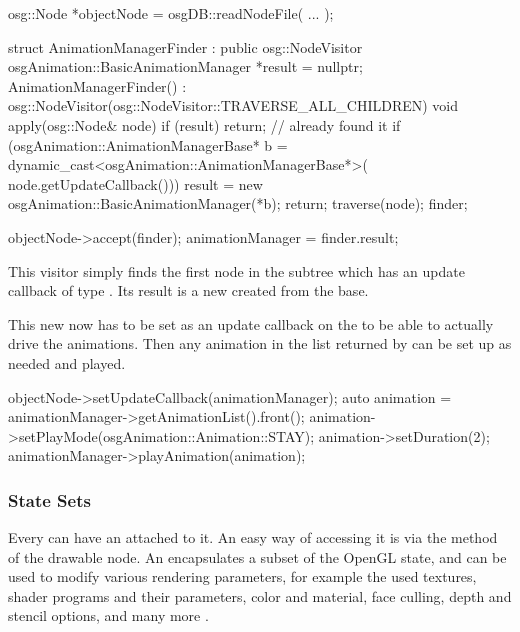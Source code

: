 \begin{cpp}
osg::Node *objectNode = osgDB::readNodeFile( ... );

struct AnimationManagerFinder : public osg::NodeVisitor {
    osgAnimation::BasicAnimationManager *result = nullptr;
    AnimationManagerFinder()
      : osg::NodeVisitor(osg::NodeVisitor::TRAVERSE_ALL_CHILDREN) {}
    void apply(osg::Node& node) {
        if (result) return; // already found it
        if (osgAnimation::AnimationManagerBase* b =
              dynamic_cast<osgAnimation::AnimationManagerBase*>(
                node.getUpdateCallback())) {
            result = new osgAnimation::BasicAnimationManager(*b);
            return;
        }
        traverse(node);
    }
} finder;

objectNode->accept(finder);
animationManager = finder.result;
\end{cpp}

This visitor simply finds the first node in the subtree which has an update
callback of type . Its result is
a new  created from the
base.

This new  now has to be set as an update callback on the
 to be able to actually drive the animations.
Then any animation in the list returned by  can be set
up as needed and played.

\begin{cpp}
objectNode->setUpdateCallback(animationManager);
auto animation = animationManager->getAnimationList().front();
animation->setPlayMode(osgAnimation::Animation::STAY);
animation->setDuration(2);
animationManager->playAnimation(animation);
\end{cpp}

\subsubsection{State Sets}

Every  can have an  attached to it.
An easy way of accessing it is via the  method of
the drawable node. An  encapsulates a subset of the OpenGL
state, and can be used to modify various rendering parameters, for example the
used textures, shader programs and their parameters, color and material,
face culling, depth and stencil options, and many more
.

